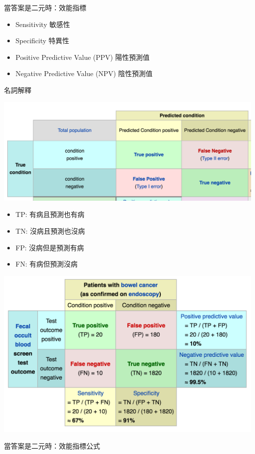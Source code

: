 \documentclass[]{book}
\providecommand{\tightlist}{%
  \setlength{\itemsep}{0pt}\setlength{\parskip}{0pt}}
\begin{document}
當答案是二元時：效能指標

\begin{itemize}
\tightlist
\item
  Sensitivity 敏感性
\item
  Specificity 特異性
\item
  Positive Predictive Value (PPV) 陽性預測值
\item
  Negative Predictive Value (NPV) 陰性預測值
\end{itemize}

名詞解釋

\includegraphics[width=20in]{figure/Cond}

\begin{itemize}
\tightlist
\item
  TP: 有病且預測也有病
\item
  TN: 沒病且預測也沒病
\item
  FP: 沒病但是預測有病
\item
  FN: 有病但預測沒病
\end{itemize}

\includegraphics[width=16.61in]{figure/para}

當答案是二元時：效能指標公式
\end{document}
